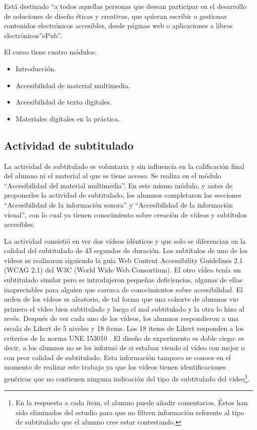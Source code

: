 \documentclass[
  12pt,
  a4paper,
  extrafontsizes,
  onecolumn,
  openright,
  table]{memoir}
\providecommand{\tightlist}{%
  \setlength{\itemsep}{0pt}\setlength{\parskip}{0pt}}\usepackage{longtable,booktabs,array}
\begin{document}
Está destinado \enquote{a todos aquellas personas que desean participar
en el desarrollo de soluciones de diseño éticas y creativas, que quieran
escribir o gestionar contenidos electrónicos accesibles, desde páginas
web o aplicaciones a libros electrónicos}ePub''.

El curso tiene cuatro módulos:

\begin{itemize}
\tightlist
\item
  Introducción.
\item
  Accesibilidad de material multimedia.
\item
  Accesibilidad de texto digitales.
\item
  Materiales digitales en la práctica.
\end{itemize}

\hypertarget{actividad-de-subtitulado}{%
\subsection{Actividad de subtitulado}\label{actividad-de-subtitulado}}

La actividad de subtitulado es voluntaria y sin influencia en la
calificación final del alumno ni el material al que se tiene acceso. Se
realiza en el módulo \enquote{Accesibilidad del material multimedia}. En
este mismo módulo, y antes de proponerles la actividad de subtitulado,
los alumnos completaron las secciones \enquote{Accesibilidad de la
información sonora} y \enquote{Accesibilidad de la información visual},
con lo cual ya tienen conocimiento sobre creación de vídeos y subtítulos
accesibles.

La actividad consistió en ver dos vídeos idénticos y que solo se
diferencian en la calidad del subtitulado de 43 segundos de duración.
Los subtítulos de uno de los vídeos se realizaron
\autocites[ver][]{jperez1,jperez2} siguiendo la guía Web Content
Accessibility Guidelines 2.1 (WCAG 2.1) del W3C (World Wide Web
Consortium). El otro vídeo tenía un subtitulado similar pero se
introdujeron pequeñas deficiencias, algunas de ellas inapreciables para
alguien que carezca de conocimientos sobre accesibilidad. El orden de
los vídeos es aleatorio, de tal forma que una cohorte de alumnos vio
primero el vídeo bien subtitulado y luego el mal subtitulado y la otra
lo hizo al revés. Después de ver cada uno de los vídeos, los alumnos
respondieron a una escala de Likert de 5 niveles y 18 ítems. Los 18
items de Likert responden a los criterios de la norma UNE 153010
\autocite[ver][]{aenor2012}. El diseño de experimento es doble ciego: es
decir, a los alumnos no se les informó de si estaban viendo el vídeo con
mejor o con peor calidad de subtitulado. Esta información tampoco se
conoce en el momento de realizar este trabajo ya que los vídeos tienen
identificaciones genéricas que no contienen ninguna indicación del tipo
de subtitulado del vídeo\footnote{En la respuesta a cada ítem, el alumno
  puede añadir comentarios. Éstos han sido eliminados del estudio para
  que no filtren información referente al tipo de subtitulado que el
  alumno cree estar contestando.}.
\end{document}
